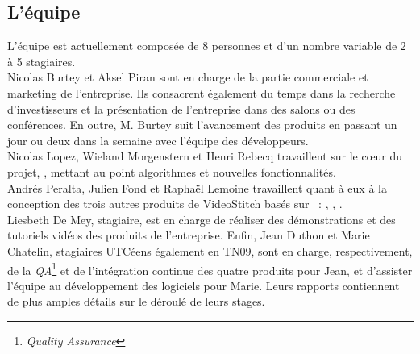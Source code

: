 \subsection{L'équipe}
L'équipe est actuellement composée de 8 personnes et d'un nombre variable de 2 à 5 stagiaires.\\
Nicolas Burtey et Aksel Piran sont en charge de
la partie commerciale et marketing de l'entreprise. Ils consacrent également
du temps dans la recherche d'investisseurs et la présentation de l'entreprise dans
des salons ou des conférences. En outre, M. Burtey suit l'avancement des produits
en passant un jour ou deux dans la semaine avec l'équipe des développeurs.\\
Nicolas Lopez, Wieland Morgenstern et Henri Rebecq travaillent sur le c\oe ur du
projet, , mettant au point algorithmes et nouvelles fonctionnalités.\\
Andrés Peralta, Julien Fond et Raphaël Lemoine travaillent quant à eux à la conception 
des trois autres produits de VideoStitch basés sur ~: 
, , .\\
Liesbeth De Mey, stagiaire, est en charge de réaliser des démonstrations et 
des tutoriels vidéos des produits de l'entreprise. Enfin, Jean Duthon et Marie
Chatelin, stagiaires UTCéens également en TN09, sont en charge, respectivement,
de la \textit{QA}\footnote{\textit{Quality Assurance}} et de l'intégration continue
des quatre produits pour Jean, et d'assister l'équipe au développement des logiciels
pour Marie. Leurs rapports contiennent de plus amples détails sur le déroulé de 
leurs stages.

